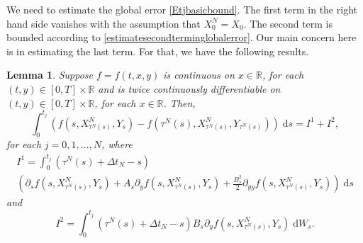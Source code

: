 \documentclass[reqno,12pt]{amsart}
\theoremstyle{plain}%
\newtheorem{lem}{Lemma}[section]
\theoremstyle{definition}
\begin{document}
We need to estimate the global error \eqref{Etjbasicbound}. The first term in the right hand side vanishes with the assumption that $X_0^N = X_0$. The second term is bounded according to \cref{estimatesecondterminglobalerror}. Our main concern here is in estimating the last term. For that, we have the following results.

\begin{lem}
    \label{lemrewritenoiseterm}
    Suppose $f=f(t, x, y)$ is continuous on $x\in \mathbb{R}$, for each $(t, y)\in [0, T]\times \mathbb{R}$ and is twice continuously differentiable on $(t, y)\in [0, T]\times \mathbb{R}$, for each $x\in \mathbb{R}$. Then,
    \begin{equation}
        \label{rewritenoiseterm}
        \int_0^{t_j} \left( f(s, X_{\tau^N(s)}^N, Y_s) - f(\tau^N(s), X_{\tau^N(s)}^N, Y_{\tau^N(s)}) \right)\;\mathrm{d}s = I^1 + I^2,
    \end{equation}
    for each $j = 0, 1, \ldots, N$, where
    \begin{multline*}
        I^1 = \int_0^{t_j} (\tau^N(s) + \Delta t_N - s) \\
        \left(\partial_s f(s, X_{\tau^N(s)}^N, Y_s) + A_s \partial_y f(s, X_{\tau^N(s)}^N, Y_s)  + \frac{B_s^2}{2}\partial_{yy}f(s, X_{\tau^N(s)}^N, Y_s) \right) \;\mathrm{d}s
    \end{multline*}
    and
    \[
        I^2 = \int_0^{t_j} (\tau^N(s) + \Delta t_N - s) B_s \partial_y f(s, X_{\tau^N(s)}^N, Y_s) \;\mathrm{d}W_s.
    \]
\end{lem}
\end{document}
